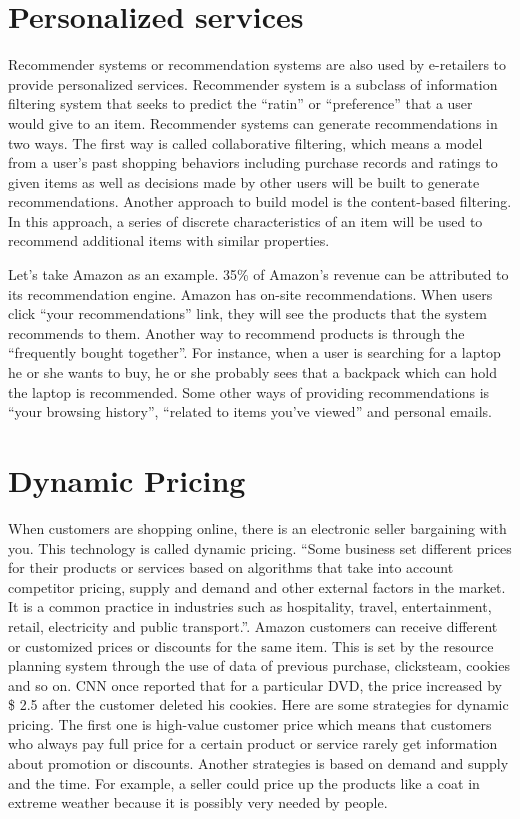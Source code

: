 \documentclass[sigconf]{acmart}
\begin{document}
\section{Personalized services}
Recommender systems or recommendation systems are also used by e-retailers to provide personalized services. Recommender system is a subclass of information filtering system that seeks to predict the ``ratin'' or ``preference'' that a user would give to an item. Recommender systems can generate recommendations in two ways. The first way is called collaborative filtering, which means a model from a user's past shopping behaviors including purchase records and ratings to given items as well as decisions made by other users will be built to generate recommendations. Another approach to build model is the content-based filtering. In this approach, a series of discrete characteristics of an item will be used to recommend additional items with similar properties\cite{Linden2003}.

Let's take Amazon as an example. 35\% of Amazon's revenue can be attributed to its recommendation engine. Amazon has on-site recommendations. When users click ``your recommendations'' link, they will see the products that the system recommends to them. Another way to recommend products is through the ``frequently bought together''. For instance, when a user is searching for a laptop he or she wants to buy, he or she probably sees that a backpack which can hold the laptop is recommended. Some other ways of providing recommendations is ``your browsing history'', ``related to items you've viewed'' and personal emails.\cite{Krawiec2017}

\section{Dynamic Pricing}
When customers are shopping online, there is an electronic seller bargaining with you. This technology is called dynamic pricing. ``Some business set different prices for their products or services based on algorithms that take into account competitor pricing, supply and demand and other external factors in the market. It is a common practice in industries such as hospitality, travel, entertainment, retail, electricity and public transport.''\cite{Wikipedia2017}. 
Amazon customers can receive different or customized prices or discounts for the same item. This is set by the resource planning system through the use of data of previous purchase, clicksteam, cookies and so on. CNN once reported that for a particular DVD, the price increased by \$ 2.5 after the customer deleted his cookies\cite{Edosio2014}.  Here are some strategies for dynamic pricing. The first one is high-value customer price which means that customers who always pay full price for a certain product or service rarely get information about promotion or discounts. Another strategies is based on demand and supply and the time. For example, a seller could price up the products like a coat in extreme weather because it is possibly very needed by people\cite{Bertulli2017}.
\end{document}
